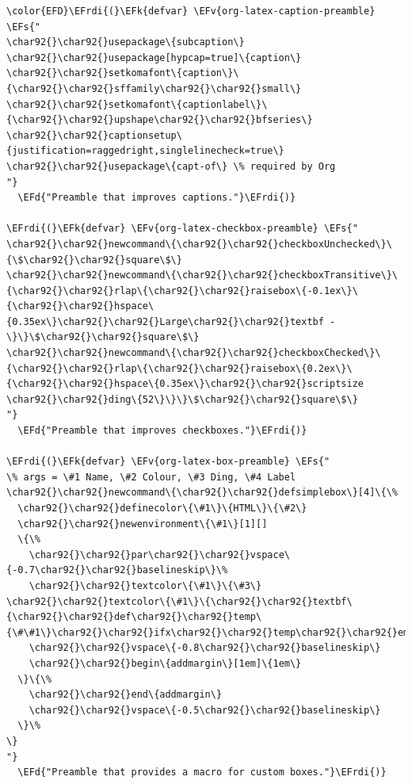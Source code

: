 \documentclass{scrartcl}
\newcommand{\EFk}[1]{\textcolor{EFk}{#1}} %
\newcommand{\EFd}[1]{\textcolor{EFd}{#1}} %
\newcommand{\EFs}[1]{\textcolor{EFs}{#1}} %
\newcommand{\EFv}[1]{\textcolor{EFv}{#1}} %
\newcommand{\EFrdi}[1]{#1} %
\begin{document}
\begin{Code}
\begin{Verbatim}[]
\color{EFD}\EFrdi{(}\EFk{defvar} \EFv{org-latex-caption-preamble} \EFs{"
\char92{}\char92{}usepackage\{subcaption\}
\char92{}\char92{}usepackage[hypcap=true]\{caption\}
\char92{}\char92{}setkomafont\{caption\}\{\char92{}\char92{}sffamily\char92{}\char92{}small\}
\char92{}\char92{}setkomafont\{captionlabel\}\{\char92{}\char92{}upshape\char92{}\char92{}bfseries\}
\char92{}\char92{}captionsetup\{justification=raggedright,singlelinecheck=true\}
\char92{}\char92{}usepackage\{capt-of\} \% required by Org
"}
  \EFd{"Preamble that improves captions."}\EFrdi{)}

\EFrdi{(}\EFk{defvar} \EFv{org-latex-checkbox-preamble} \EFs{"
\char92{}\char92{}newcommand\{\char92{}\char92{}checkboxUnchecked\}\{\$\char92{}\char92{}square\$\}
\char92{}\char92{}newcommand\{\char92{}\char92{}checkboxTransitive\}\{\char92{}\char92{}rlap\{\char92{}\char92{}raisebox\{-0.1ex\}\{\char92{}\char92{}hspace\{0.35ex\}\char92{}\char92{}Large\char92{}\char92{}textbf -\}\}\$\char92{}\char92{}square\$\}
\char92{}\char92{}newcommand\{\char92{}\char92{}checkboxChecked\}\{\char92{}\char92{}rlap\{\char92{}\char92{}raisebox\{0.2ex\}\{\char92{}\char92{}hspace\{0.35ex\}\char92{}\char92{}scriptsize \char92{}\char92{}ding\{52\}\}\}\$\char92{}\char92{}square\$\}
"}
  \EFd{"Preamble that improves checkboxes."}\EFrdi{)}

\EFrdi{(}\EFk{defvar} \EFv{org-latex-box-preamble} \EFs{"
\% args = \#1 Name, \#2 Colour, \#3 Ding, \#4 Label
\char92{}\char92{}newcommand\{\char92{}\char92{}defsimplebox\}[4]\{\%
  \char92{}\char92{}definecolor\{\#1\}\{HTML\}\{\#2\}
  \char92{}\char92{}newenvironment\{\#1\}[1][]
  \{\%
    \char92{}\char92{}par\char92{}\char92{}vspace\{-0.7\char92{}\char92{}baselineskip\}\%
    \char92{}\char92{}textcolor\{\#1\}\{\#3\} \char92{}\char92{}textcolor\{\#1\}\{\char92{}\char92{}textbf\{\char92{}\char92{}def\char92{}\char92{}temp\{\#\#1\}\char92{}\char92{}ifx\char92{}\char92{}temp\char92{}\char92{}empty\#4\char92{}\char92{}else\#\#1\char92{}\char92{}fi\}\}\%
    \char92{}\char92{}vspace\{-0.8\char92{}\char92{}baselineskip\}
    \char92{}\char92{}begin\{addmargin\}[1em]\{1em\}
  \}\{\%
    \char92{}\char92{}end\{addmargin\}
    \char92{}\char92{}vspace\{-0.5\char92{}\char92{}baselineskip\}
  \}\%
\}
"}
  \EFd{"Preamble that provides a macro for custom boxes."}\EFrdi{)}
\end{Verbatim}
\end{Code}
\end{document}
